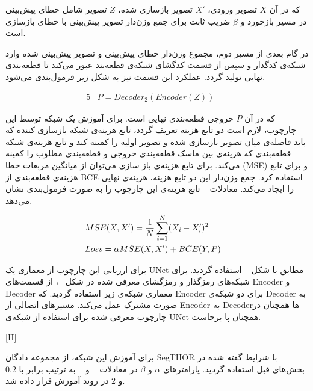 که در آن $X$ تصویر ورودی، $X'$ تصویر بازسازی شده، $Z$ تصویر شامل‌ خطای پیش‌بینی در مسیر بازخورد و $\beta$ ضریب ثابت برای جمع وزن‌دار تصویر پیش‌بینی با خطای بازسازی است.

در گام بعدی از مسیر دوم، مجموع وزن‌دار خطای پیش‌بینی و تصویر پیش‌بینی شده وارد شبکه‌ی کدگذار و سپس از قسمت کدگشای شبکه‌ی قطعه‌بند عبور می‌کند تا قطعه‌بندی نهایی تولید گردد. عملکرد این قسمت نیز به شکل زیر فرمول‌بندی می‌شود.

\begin{alignat}{5}
	&P = Decoder_2(Encoder(Z))    \label{segpep} &&
\end{alignat}

که در آن $P$ خروجی قطعه‌بندی نهایی است. برای آموزش یک شبکه توسط این چارچوب، لازم است دو تابع هزینه تعریف گردد، تابع هزینه‌ی شبکه بازسازی کننده که باید فاصله‌ی میان تصویر بازسازی شده و تصویر اولیه را کمینه کند و تابع هزینه‌ی شبکه قطعه‌بندی که هزینه‌ی بین ماسک قطعه‌بندی خروجی و قطعه‌بندی مطلوب را کمینه می‌کند. برای تابع هزینه‌ی باز سازی می‌توان از میانگین مربعات خطا (MSE) و برای تابع هزینه‌ی قطعه‌بندی از BCE استفاده کرد. جمع وزن‌دار این دو تابع هزینه، هزینه‌ی نهایی را ایجاد می‌کند. معادلات  ~ تابع هزینه‌ی این چارچوب را به صورت فرمول‌بندی نشان می‌دهد.

\begin{alignat}{5}
	&MSE(X, X') = \frac{1}{N} \sum_{i=1}^{N}(X_i-X_i')^2    \notag  && \\
	&Loss = \alpha MSE(X, X') + BCE(Y, P) && \label{pepfinalloss}
\end{alignat}

برای ارزیابی این چارچوب از معماری یک UNet مطابق با شکل ~ استفاده گردید. برای شبکه‌های رمزگذار و رمزگشای معرفی شده در شکل ~، از قسمت‌های Encoder و  Decoder معماری شبکه‌ی زیر استفاده گردید. که Encoder برای دو شبکه‌ی Decoder به صورت مشترک عمل می‌کند. مسیرهای اتصالی از Encoder به Decoder‌ها همچنان در چارچوب معرفی شده برای استفاده از شبکه‌ی UNet همچنان پا برجاست.

[H]

برای آموزش این شبکه، از مجموعه دادگان SegTHOR با شرایط گفته شده در بخش‌های قبل استفاده گردید. پارامترهای $\alpha$ و $\beta$ در معادلات ~ و ~ به ترتیب برابر با $0.2$ و $2$ در روند آموزش قرار داده شد.


